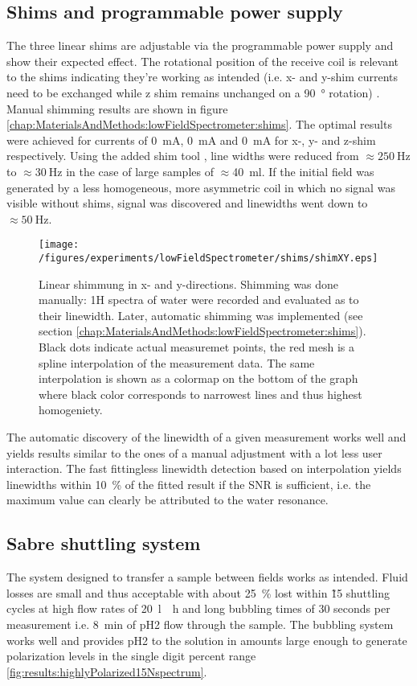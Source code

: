     \subsection{Shims and programmable power supply}
        The three linear shims are adjustable via the programmable power supply and show their expected effect. The rotational position of the receive coil is relevant to the shims indicating they're working as intended (i.e. x- and y-shim currents need to be exchanged while z shim remains unchanged on a \SI{90}{\degree} rotation) . Manual shimming results are shown in figure \ref{chap:MaterialsAndMethods:lowFieldSpectrometer:shims}. The optimal results were achieved for currents of \SI{0}{\milli\ampere},  \SI{0}{\milli\ampere} and \SI{0}{\milli\ampere} for x-, y- and z-shim respectively. Using the added shim tool , line widths were reduced from $\approx \SI{250}{\hertz}$ to $\approx \SI{30}{\hertz}$ in the case of large samples of $\approx $\SI{40}{\milli\litre}. If the initial field was generated by a less homogeneous, more asymmetric coil in which no signal was visible without shims, signal was discovered and linewidths went down to $\approx \SI{50}{\hertz}$.
        \begin{figure}
            \label{fig:results:lowFieldSpectrometer:shims}
            \texttt{[image: /figures/experiments/lowFieldSpectrometer/shims/shimXY.eps]}
            \caption[Manual low field shimming]{Linear shimmung in x- and y-directions. Shimming was done manually: 1H spectra of water were recorded and evaluated as to their linewidth. Later, automatic shimming was implemented (see section \ref{chap:MaterialsAndMethods:lowFieldSpectrometer:shims}). Black dots indicate actual measuremet points, the red mesh is a spline interpolation of the measurement data. The same interpolation is shown as a colormap on the bottom of the graph where black color corresponds to narrowest lines and thus highest homogeniety.}
        \end{figure}
        The automatic discovery of the linewidth of a given measurement works well and yields results similar to the ones of a manual adjustment with a lot less user interaction. The fast fittingless linewidth detection based on interpolation yields linewidths within \SI{10}{\percent} of the fitted result if the SNR is sufficient, i.e. the maximum value can clearly be attributed to the water resonance.
    \subsection{Sabre shuttling system}
        The system designed to transfer a sample between fields works as intended. Fluid losses are small and thus
        acceptable with about \SI{25}{\percent} lost within \~15 shuttling cycles at high flow rates of \SI{20}{\litre
        \per\hour} and long bubbling times of 30 seconds per measurement i.e. \SI{8}{\minute} of pH2 flow through the
        sample. The bubbling system works well and provides pH2 to the solution in amounts large enough to generate
        polarization levels in the single digit percent range \ref{fig:results:highlyPolarized15Nspectrum}.
